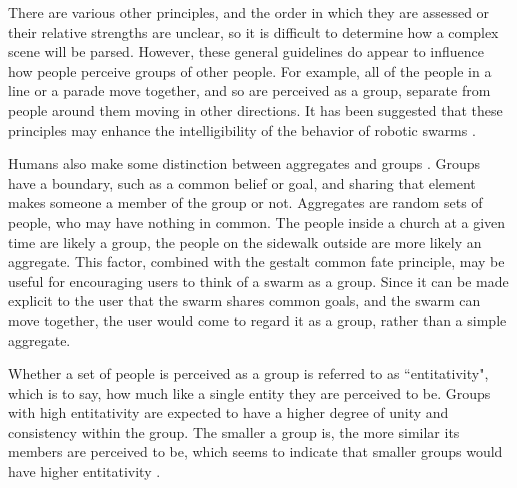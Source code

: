 There are various other principles, and the order in which they are assessed or their relative strengths are unclear, so it is difficult to determine how a complex scene will be parsed. 
However, these general guidelines do appear to influence how people perceive groups of other people. For example, all of the people in a line or a parade move together, and so are perceived as a group, separate from people around them moving in other directions.
It has been suggested that these principles may enhance the intelligibility of the behavior of robotic swarms \citep{nagavalli2018algorithms}. 

Humans also make some distinction between aggregates and groups \citep{wilder1978perceiving}.
Groups have a boundary, such as a common belief or goal, and sharing that element makes someone a member of the group or not. 
Aggregates are random sets of people, who may have nothing in common.
The people inside a church at a given time are likely a group, the people on the sidewalk outside are more likely an aggregate. 
This factor, combined with the gestalt common fate principle, may be useful for encouraging users to think of a swarm as a group. 
Since it can be made explicit to the user that the swarm shares common goals, and the swarm can move together, the user would come to regard it as a group, rather than a simple aggregate. 

Whether a set of people is perceived as a group is referred to as ``entitativity", which is to say, how much like a single entity they are perceived to be. 
Groups with high entitativity are expected to have a higher degree of unity and consistency within the group. 
The smaller a group is, the more similar its members are perceived to be, which seems to indicate that smaller groups would have higher entitativity \citep{stewart2003trust}. 

